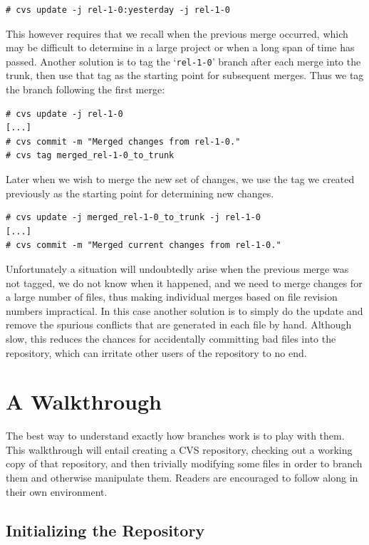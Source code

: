 \documentclass[12pt,letterpaper]{article}
\newcommand{\cmd}[1]{`\texttt{#1}'}
\begin{document}
\begin{Verbatim}
# cvs update -j rel-1-0:yesterday -j rel-1-0
\end{Verbatim}

This however requires that we recall when the previous merge occurred, which
may be difficult to determine in a large project or when a long span of time
has passed.  Another solution is to tag the \cmd{rel-1-0} branch after each
merge into the trunk, then use that tag as the starting point for subsequent
merges.  Thus we tag the branch following the first merge:

\begin{Verbatim}
# cvs update -j rel-1-0
[...]
# cvs commit -m "Merged changes from rel-1-0."
# cvs tag merged_rel-1-0_to_trunk
\end{Verbatim}

Later when we wish to merge the new set of changes, we use the tag we created
previously as the starting point for determining new changes.

\begin{Verbatim}
# cvs update -j merged_rel-1-0_to_trunk -j rel-1-0
[...]
# cvs commit -m "Merged current changes from rel-1-0."
\end{Verbatim}

Unfortunately a situation will undoubtedly arise when the previous merge was
not tagged, we do not know when it happened, and we need to merge changes for
a large number of files, thus making individual merges based on file revision
numbers impractical.  In this case another solution is to simply do the update
and remove the spurious conflicts that are generated in each file by hand.
Although slow, this reduces the chances for accidentally committing bad files
into the repository, which can irritate other users of the repository to no
end.



\section{A Walkthrough}

The best way to understand exactly how branches work is to play with them.
This walkthrough will entail creating a CVS repository, checking out a working
copy of that repository, and then trivially modifying some files in order to
branch them and otherwise manipulate them.  Readers are encouraged to follow
along in their own environment.

\subsection{Initializing the Repository}
\end{document}
